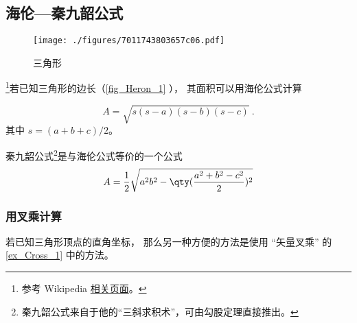 

\subsection{海伦—秦九韶公式}
\begin{figure}[ht]
\centering
\texttt{[image: ./figures/7011743803657c06.pdf]}
\caption{三角形} \label{fig_Heron_1}
\end{figure}
\footnote{参考 Wikipedia \href{https://en.wikipedia.org/wiki/Heron's_formula}{相关页面}。}若已知三角形的边长（\autoref{fig_Heron_1} ）， 其面积可以用海伦公式计算

\begin{equation}\label{eq_Heron_1}
A = \sqrt{s(s-a)(s-b)(s-c)}~.
\end{equation}
其中 $s = (a+b+c)/2$。

秦九韶公式\footnote{秦九韶公式来自于他的“三斜求积术”，可由勾股定理直接推出。}是与海伦公式等价的一个公式
\begin{equation}
A = \frac{1}{2}\sqrt{a^2b^2-\qty(\frac{a^2+b^2-c^2}{2})^2}
\end{equation}

\subsubsection{用叉乘计算}
若已知三角形顶点的直角坐标， 那么另一种方便的方法是使用 “矢量叉乘” 的\autoref{ex_Cross_1} 中的方法。

